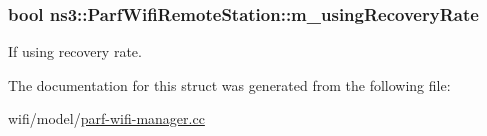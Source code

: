 \subsubsection[{\texorpdfstring{m\+\_\+using\+Recovery\+Rate}{m_usingRecoveryRate}}]{\setlength{\rightskip}{0pt plus 5cm}bool ns3\+::\+Parf\+Wifi\+Remote\+Station\+::m\+\_\+using\+Recovery\+Rate}\hypertarget{structns3_1_1ParfWifiRemoteStation_a50166b4876038ce4ddce7081829f8cb1}{}\label{structns3_1_1ParfWifiRemoteStation_a50166b4876038ce4ddce7081829f8cb1}


If using recovery rate. 



The documentation for this struct was generated from the following file\+:\begin{DoxyCompactItemize}
\item 
wifi/model/\hyperlink{parf-wifi-manager_8cc}{parf-\/wifi-\/manager.\+cc}\end{DoxyCompactItemize}
